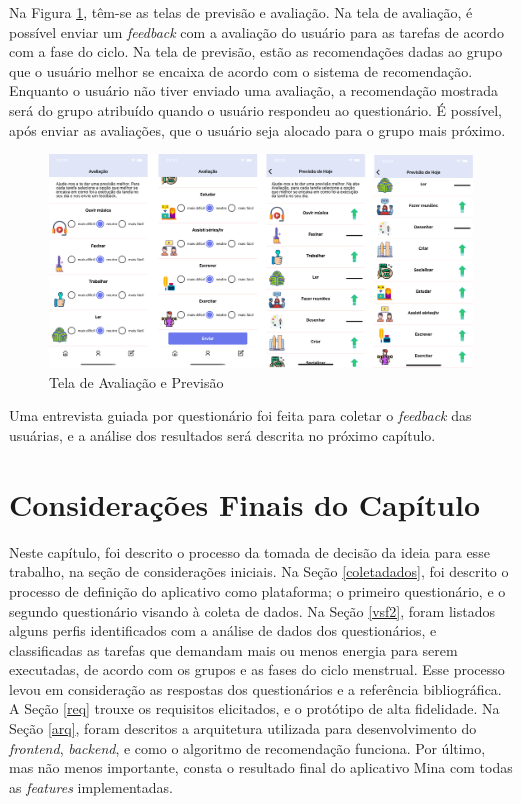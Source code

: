 Na Figura \ref{fig22}, têm-se as telas de previsão e avaliação. Na tela de avaliação, é possível enviar 
um \emph{feedback} com a avaliação do usuário para as tarefas de acordo com a fase do ciclo. Na tela de 
previsão, estão as recomendações dadas ao grupo que o usuário melhor se encaixa de acordo com o sistema de recomendação.
Enquanto o usuário não tiver enviado uma avaliação, a recomendação mostrada será do grupo atribuído quando o 
usuário respondeu ao questionário. É possível, 
após enviar as avaliações, que o usuário seja alocado para o grupo mais próximo.

\begin{figure}[htbp]
	\caption{Tela de Avaliação e Previsão}
	\begin{center}
	\includegraphics[keepaspectratio=true,scale=0.08]{figuras/aplicativo3.png}
	\end{center}
    \label{fig22}
\end{figure}

Uma entrevista guiada por questionário foi feita para coletar o \emph{feedback} das usuárias, e a análise 
dos resultados será descrita no próximo capítulo. 


\section{Considerações Finais do Capítulo}

Neste capítulo, foi descrito o processo da tomada de decisão 
da ideia para 
esse trabalho, na seção de considerações iniciais. Na Seção 
\ref{coletadados}, 
foi descrito o processo de definição do aplicativo como 
plataforma; o primeiro questionário, e o segundo questionário 
visando à coleta de dados. Na Seção \ref{vsf2}, foram 
listados alguns perfis identificados 
com a análise de dados dos questionários, e classificadas as 
tarefas que demandam mais ou menos energia 
para serem executadas, de acordo com os grupos e as fases do ciclo menstrual. 
Esse processo levou em consideração 
as respostas dos questionários e a referência bibliográfica. 
A Seção \ref{req} trouxe os requisitos elicitados, e o protótipo de alta fidelidade. 
Na Seção \ref{arq}, foram descritos a arquitetura utilizada para desenvolvimento do 
\emph{frontend}, \emph{backend}, e como o algoritmo de recomendação funciona. Por último, 
mas não menos importante, consta o resultado final do aplicativo Mina com todas as \emph{features} 
implementadas.
